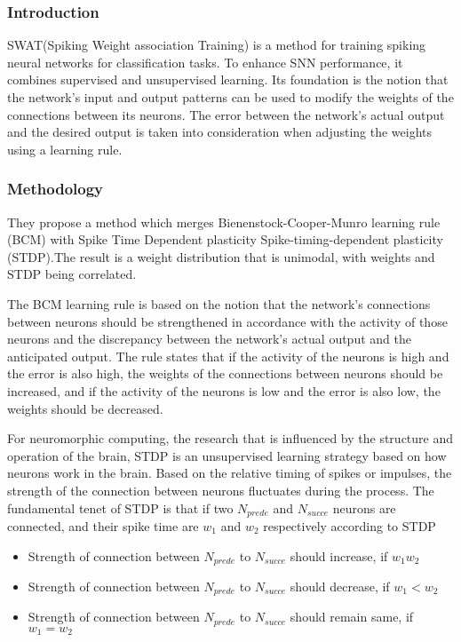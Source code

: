 \subsubsection{Introduction}
SWAT\cite{swat}(Spiking Weight association Training) is a method for training
spiking neural networks for classification tasks. To enhance SNN performance,
it combines supervised and unsupervised learning. Its foundation is the notion
that the network's input and output patterns can be used to modify the weights
of the connections between its neurons. The error between the network's actual
output and the desired output is taken into consideration when adjusting the
weights using a learning rule.
\subsubsection{Methodology}
They propose a method which merges Bienenstock-Cooper-Munro learning rule
(BCM)\cite{bcm} with Spike Time Dependent plasticity Spike-timing-dependent
plasticity (STDP)\cite{stdp}.The result is a weight distribution that is
unimodal, with weights and STDP being correlated.

The BCM learning rule is based on the notion that the network's connections
between neurons should be strengthened in accordance with the activity of those
neurons and the discrepancy between the network's actual output and the
anticipated output. The rule states that if the activity of the neurons is high
and the error is also high, the weights of the connections between neurons
should be increased, and if the activity of the neurons is low and the error is
also low, the weights should be decreased.

For neuromorphic computing, the research that is influenced by the structure
and operation of the brain, STDP is an unsupervised learning strategy based on
how neurons work in the brain. Based on the relative timing of spikes or
impulses, the strength of the connection between neurons fluctuates during the
process. The fundamental tenet of STDP is that if two $N_{prede}$ and
$N_{succe}$ neurons are connected, and their spike time are $w_1$ and $w_2$
respectively according to STDP \vspace*{-.3pc}
\begin{itemize}
    \item[]Strength of connection between $N_{prede}$ to $N_{succe}$ should  increase, if {\boldmath$w_1 w_2$}
    \item[]Strength of connection between $N_{prede}$ to $N_{succe}$ should  decrease, if {\boldmath$w_1<w_2$}
    \item[]Strength of connection between $N_{prede}$ to $N_{succe}$ should  remain same, if {\boldmath$w_1=w_2$}

\end{itemize}

